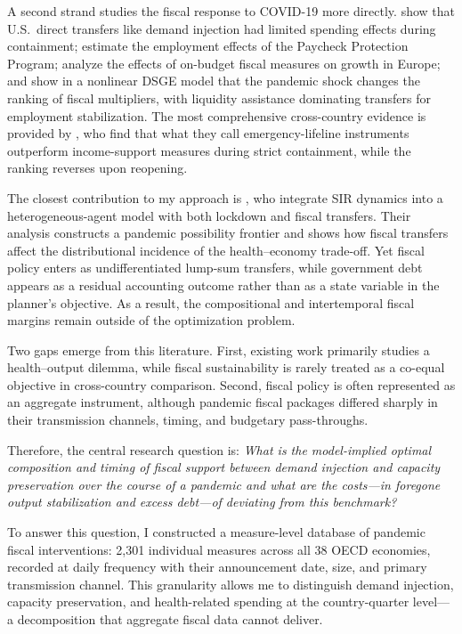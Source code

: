 \documentclass[12pt, a4paper]{article}
\begin{document}
A second strand studies the fiscal response to COVID-19 more directly. \citet{chetty2020} show that U.S.\ direct transfers like demand injection had limited spending effects during containment; \citet{Autor2022} estimate the employment effects of the Paycheck Protection Program; \citet{Pappa2022} analyze the effects of on-budget fiscal measures on growth in Europe; and \citet{fariaecastro2021} show in a nonlinear DSGE model that the pandemic shock changes the ranking of fiscal multipliers, with liquidity assistance dominating transfers for employment stabilization. The most comprehensive cross-country evidence is provided by \citet{deb2021}, who find that what they call emergency-lifeline instruments outperform income-support measures during strict containment, while the ranking reverses upon reopening.


The closest contribution to my approach is \citet{KaplanMollViolante2020}, who integrate SIR dynamics into a heterogeneous-agent model with both lockdown and fiscal transfers. Their analysis constructs a pandemic possibility frontier and shows how fiscal transfers affect the distributional incidence of the health--economy trade-off. Yet fiscal policy enters as undifferentiated lump-sum transfers, while government debt appears as a residual accounting outcome rather than as a state variable in the planner's objective. As a result, the compositional and intertemporal fiscal margins remain outside of the optimization problem.

Two gaps emerge from this literature. First, existing work primarily studies a health--output dilemma, while fiscal sustainability is rarely treated as a co-equal objective in cross-country comparison. Second, fiscal policy is often represented as an aggregate instrument, although pandemic fiscal packages differed sharply in their transmission channels, timing, and budgetary pass-throughs.

Therefore, the central research question is: \textit{What is the model-implied optimal composition and timing of fiscal support between demand injection and capacity preservation over the course of a pandemic and what are the costs---in foregone output stabilization and excess debt---of deviating from this benchmark?}

To answer this question, I constructed a measure-level database of pandemic fiscal interventions: 2,301 individual measures across all 38 OECD economies, recorded at daily frequency with their announcement date, size, and primary transmission channel. This granularity allows me to distinguish demand injection, capacity preservation, and health-related spending at the country-quarter level---a decomposition that aggregate fiscal data cannot deliver.
\end{document}
